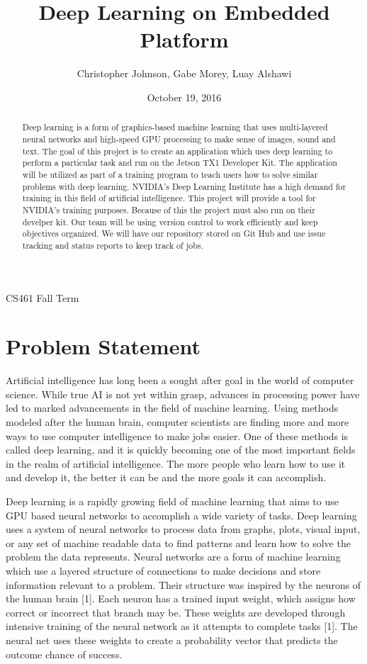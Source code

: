 \documentclass[letterpaper,10pt]{article}
\author{Christopher Johnson, Gabe Morey, Luay Alshawi}
\title{Deep Learning on Embedded Platform}
\date{October 19, 2016}
\begin{document}
\begin{titlingpage}
\maketitle
CS461 Fall Term
\begin{abstract}
Deep learning is a form of graphics-based machine learning that uses multi-layered neural networks and high-speed GPU processing to make sense of images, sound and text. The goal of this project is to create an application which uses deep learning to perform a particular task and run on the Jetson TX1 Developer Kit. The application will be utilized as part of a training program to teach users how to solve similar problems with deep learning. NVIDIA's Deep Learning Institute has a high demand for training in this field of artificial intelligence. This project will provide a tool for NVIDIA's training purposes. Because of this the project must also run on their develper kit. Our team will be using version control to work efficiently and keep objectives organized. We will have our repository stored on Git Hub and use issue tracking and status reports to keep track of jobs.
\end{abstract}
\end{titlingpage}

\section{Problem Statement}
Artificial intelligence has long been a sought after goal in the world of computer science.
 While true AI is not yet within grasp, advances in processing power have led to marked advancements in the field of machine learning.
 Using methods modeled after the human brain, computer scientists are finding more and more ways to use computer intelligence to make jobs easier.
 One of these methods is called deep learning, and it is quickly becoming one of the most important fields in the realm of artificial intelligence.
 The more people who learn how to use it and develop it, the better it can be and the more goals it can accomplish.


Deep learning is a rapidly growing field of machine learning that aims to use GPU based neural networks to accomplish a wide variety of tasks.
 Deep learning uses a system of neural networks to process data from graphs, plots, visual input, or any set of machine readable data to find patterns and learn how to solve the problem the data represents.
 Neural networks are a form of machine learning which use a layered structure of connections to make decisions and store information relevant to a problem.
 Their structure was inspired by the neurons of the human brain [1].
 Each neuron has a trained input weight, which assigns how correct or incorrect that branch may be.
 These weights are developed through intensive training of the neural network as it attempts to complete tasks [1].
  The neural net uses these weights to create a probability vector that predicts the outcome chance of success.
\end{document}

